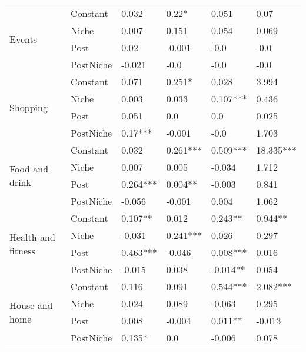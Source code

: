 \begin{longtable}[h!]{llllll}
\cline{1-6}
\multirow{4}{*}{Events} & Constant &               0.032 &       0.22* &      0.051 &       0.07 \\
          & Niche &               0.007 &       0.151 &      0.054 &      0.069 \\
          & Post &                0.02 &      -0.001 &       -0.0 &       -0.0 \\
          & PostNiche &              -0.021 &        -0.0 &       -0.0 &       -0.0 \\
\cline{1-6}
\multirow{4}{*}{Shopping} & Constant &               0.071 &      0.251* &      0.028 &      3.994 \\
          & Niche &               0.003 &       0.033 &   0.107*** &      0.436 \\
          & Post &               0.051 &         0.0 &        0.0 &      0.025 \\
          & PostNiche &             0.17*** &      -0.001 &       -0.0 &      1.703 \\
\cline{1-6}
\multirow{4}{*}{Food and drink} & Constant &               0.032 &    0.261*** &   0.509*** &  18.335*** \\
          & Niche &               0.007 &       0.005 &     -0.034 &      1.712 \\
          & Post &            0.264*** &     0.004** &     -0.003 &      0.841 \\
          & PostNiche &              -0.056 &      -0.001 &      0.004 &      1.062 \\
\cline{1-6}
\multirow{4}{*}{Health and fitness} & Constant &             0.107** &       0.012 &    0.243** &    0.944** \\
          & Niche &              -0.031 &    0.241*** &      0.026 &      0.297 \\
          & Post &            0.463*** &      -0.046 &   0.008*** &      0.016 \\
          & PostNiche &              -0.015 &       0.038 &   -0.014** &      0.054 \\
\cline{1-6}
\multirow{4}{*}{House and home} & Constant &               0.116 &       0.091 &   0.544*** &   2.082*** \\
          & Niche &               0.024 &       0.089 &     -0.063 &      0.295 \\
          & Post &               0.008 &      -0.004 &    0.011** &     -0.013 \\
          & PostNiche &              0.135* &         0.0 &     -0.006 &      0.078 \\

\end{longtable}
